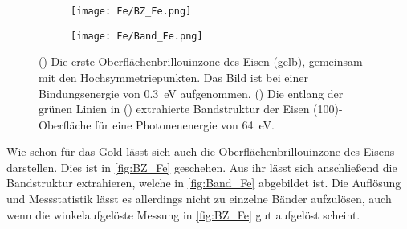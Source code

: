         \begin{figure}
            \begin{subfigure}[t]{0.34\textwidth}
                \centering
                \texttt{[image: Fe/BZ\_Fe.png]}
                \subcaption{}
                \label{fig:BZ_Fe}
            \end{subfigure}
            \begin{subfigure}[t]{0.62\textwidth}
                \centering
                \texttt{[image: Fe/Band\_Fe.png]}
                \subcaption{}
                \label{fig:Band_Fe}
            \end{subfigure}
            \caption{() Die erste Oberflächenbrillouinzone des Eisen (gelb), gemeinsam mit den Hochsymmetriepunkten. Das Bild ist bei einer Bindungsenergie von \SI{0.3}{\electronvolt} aufgenommen.
            () Die entlang der grünen Linien in () extrahierte Bandstruktur der Eisen (100)-Oberfläche für eine Photonenenergie von \SI{64}{\electronvolt}.}
        \end{figure}
        Wie schon für das Gold lässt sich auch die Oberflächenbrillouinzone des Eisens darstellen. 
        Dies ist in \autoref{fig:BZ_Fe} geschehen.
        Aus ihr lässt sich anschließend die Bandstruktur extrahieren, welche in \autoref{fig:Band_Fe} abgebildet ist.
        Die Auflösung und Messstatistik lässt es allerdings nicht zu einzelne Bänder aufzulösen, auch wenn die winkelaufgelöste Messung in \autoref{fig:BZ_Fe} gut aufgelöst scheint. 

